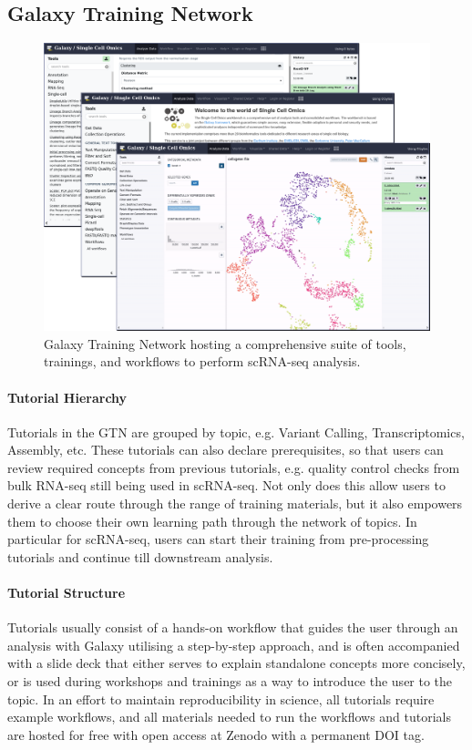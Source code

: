 \documentclass[a4paper,num-refs]{oup-contemporary}
\begin{document}
\subsection{Galaxy Training Network}

\begin{figure}[bt!]
\centering
\includegraphics[width=\linewidth]{Images/scrna_omics3.png}
\caption{Galaxy Training Network hosting a comprehensive suite of tools, trainings, and workflows to perform scRNA-seq analysis.}\label{fig:portals}
\end{figure}

\paragraph{Tutorial Hierarchy}
Tutorials in the GTN are grouped by topic, e.g. Variant Calling, Transcriptomics, Assembly, etc. These tutorials can also declare prerequisites, so that users can review required concepts from previous tutorials, e.g. quality control checks from bulk RNA-seq still being used in scRNA-seq. Not only does this allow users to derive a clear route through the range of training materials, but it also empowers them to choose their own learning path through the network of topics. In particular for scRNA-seq, users can start their training from pre-processing tutorials and continue till downstream analysis.

\paragraph{Tutorial Structure}
Tutorials usually consist of a hands-on workflow that guides the user through an analysis with Galaxy utilising a step-by-step approach, and is often accompanied with a slide deck that either serves to explain standalone concepts more concisely, or is used during workshops and trainings as a way to introduce the user to the topic. In an effort to maintain reproducibility in science, all tutorials require example workflows, and all materials needed to run the workflows and tutorials are hosted for free with open access at Zenodo with a permanent DOI tag.
\end{document}
